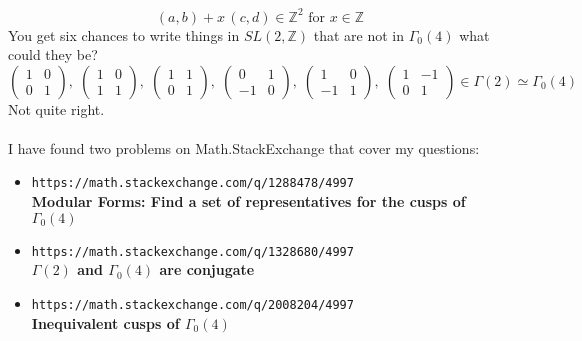 \documentclass[12pt]{article}
\begin{document}
$$ (a,b) + x \, (c,d) \in \mathbb{Z}^2 \text{ for } x \in \mathbb{Z}$$
You get six chances to write things in $SL(2, \mathbb{Z})$ that are not in $\Gamma_0(4)$ what could they be?
$$
\left( \begin{array}{cc} 1 &  0 \\  0 & 1\end{array} \right),\; 
\left( \begin{array}{cc} 1 &  0 \\  1 & 1\end{array} \right),\; 
\left( \begin{array}{cc} 1 &  1 \\  0 & 1\end{array} \right),\; 
\left( \begin{array}{rc} 0 &  1 \\ -1 & 0\end{array} \right),\; 
\left( \begin{array}{rc} 1 &  0 \\ -1 & 1\end{array} \right),\; 
\left( \begin{array}{cr} 1 & -1 \\  0 & 1\end{array} \right) 
 \in \Gamma(2) \simeq \Gamma_0(4)$$
Not quite right. \\ \\
I have found two problems on Math.StackExchange that cover my questions:
\begin{itemize}
\item \texttt{https://math.stackexchange.com/q/1288478/4997}\\
\textbf{Modular Forms: Find a set of representatives for the cusps of $\Gamma_0(4)$}
\item \texttt{https://math.stackexchange.com/q/1328680/4997} \\
\textbf{$\Gamma(2)$ and $\Gamma_0(4)$ are conjugate}
\item \texttt{https://math.stackexchange.com/q/2008204/4997} \\
\textbf{Inequivalent cusps of $\Gamma_0(4)$}
\end{itemize}

\newpage
\end{document}
